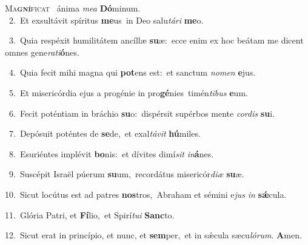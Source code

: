 \lettrine{\initial\textcolor{\initialcolor}{M}}{a\-\textbf{gní}\-ficat~\star} ánima \textit{me}\-\textit{a} \textbf{Dó}\-minum.\\
{\numbfont\textcolor{\numbcolor}{~2.}}~Et exsultávit spíritus \textbf{me}\-us~\star in Deo salu\-\textit{tá}\-\textit{ri} \textbf{me}\-o.\par
{\numbfont\textcolor{\numbcolor}{~3.}}~Quia respéxit humilitátem ancíllæ \textbf{su}\-æ:~\star ecce enim ex hoc beátam me dicent omnes gene\-\textit{ra}\-\textit{ti}\textbf{ó}nes.\par
{\numbfont\textcolor{\numbcolor}{~4.}}~Quia fecit mihi magna qui \textbf{pot}\-ens est:~\star et sanctum \textit{no}\-\textit{men} \textbf{e}\-jus.\par
{\numbfont\textcolor{\numbcolor}{~5.}}~Et misericórdia ejus a progénie in pro\-\textbf{gé}\-nies~\star timén\-\textit{ti}\-\textit{bus} \textbf{e}\-um.\par
{\numbfont\textcolor{\numbcolor}{~6.}}~Fecit poténtiam in bráchio \textbf{su}\-o:~\star dispérsit supérbos mente \textit{cor}\-\textit{dis} \textbf{su}\-i.\par
{\numbfont\textcolor{\numbcolor}{~7.}}~Depósuit poténtes de \textbf{se}\-de,~\star et exal\-\textit{tá}\-\textit{vit} \textbf{hú}\-miles.\par
{\numbfont\textcolor{\numbcolor}{~8.}}~Esuriéntes implévit \textbf{bo}\-nis:~\star et dívites dimí\textit{sit} \textit{in}\-\textbf{á}nes.\par
{\numbfont\textcolor{\numbcolor}{~9.}}~Suscépit Israël púerum \textbf{su}\-um,~\star recordátus misericór\-\textit{di}\-\textit{æ} \textbf{su}\-æ.\par
{\numbfont\textcolor{\numbcolor}{10.}}~Sicut locútus est ad patres \textbf{nos}\-tros,~\star Abraham et sémini e\textit{jus} \textit{in} \textbf{sǽ}\-cula.\par
{\numbfont\textcolor{\numbcolor}{11.}}~Glória Patri, et \textbf{Fí}\-lio,~\star et Spirí\-\textit{tu}\-\textit{i} \textbf{Sanc}\-to.\par
{\numbfont\textcolor{\numbcolor}{12.}}~Sicut erat in princípio, et nunc, et \textbf{sem}\-per,~\star et in sǽcula sæcu\-\textit{ló}\-\textit{rum}. \textbf{A}\-men.\par
